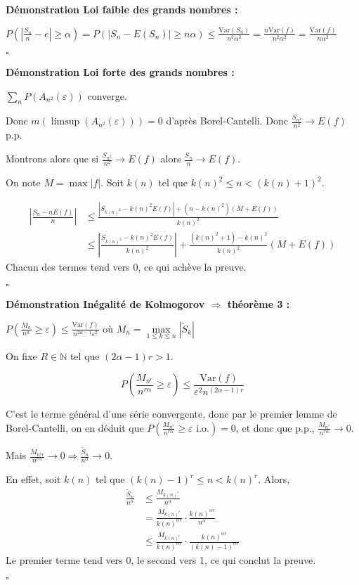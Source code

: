 \documentclass[10pt,a4paper,notitlepage ]{report}
\newcommand{\N}{\mathbb N}
\newcommand{\1}{\mathds 1}
\newcommand{\eps}{\varepsilon}
\newcommand{\var}{\mathrm{Var}}
\newcounter{th}
\newenvironment{demo}[1][]{

	\textbf{Démonstration #1 :}
}{\begin{flushright}
	$\square$
\end{flushright}
}
\begin{document}
\begin{demo}[Loi faible des grands nombres]
	
	$P(\left|\frac {S_n} n - e \right| \ge \alpha) = P(|S_n - E(S_n)| \ge n\alpha) \le \frac{\var(S_n)}{n^2\alpha^2} = \frac{n \var(f)}{n^2\alpha^2} = \frac{\var(f)}{n\alpha^2}$
\end{demo}

\begin{demo}[Loi forte des grands nombres]
	$\sum_n P(A_{n^2}(\eps))$ converge.
	
	Donc $m(\limsup(A_{n^2}(\eps)))= 0$ d'après Borel-Cantelli. Donc $\frac {S_{n^2}} {n^2} \rightarrow E(f)$ p.p.
	
	Montrons alors que si $\frac {S_{n^2}} {n^2} \rightarrow E(f)$ alors $\frac {S_n} n \rightarrow E(f)$.
	
	On note $M = \max |f|$. Soit $k(n)$ tel que $k(n)^2 \le n < (k(n) + 1)^2$.
	
	\begin{align*}
		\left| \frac{S_n - nE(f)} n \right| &\le \frac{|S_{k(n)^2} - k(n)^2E(f)| + (n-k(n)^2)(M+E(f))}{k(n)^2} \\
		&\le \left| \frac {S_{k(n)^2} - k(n)^2E(f)}{k(n)^2} \right| + \frac{(k(n)^2 +1) - k(n)^2}{k(n)^2} (M + E(f))
	\end{align*}
	Chacun des termes tend vers $0$, ce qui achève la preuve.
\end{demo}

\begin{demo}[Inégalité de Kolmogorov $\Rightarrow$ théorème 3]
	
	$P(\frac{M_n}{n^\alpha} \ge \eps) \le \frac{\var(f)}{n^{2\alpha -1}\eps^2}$ où $M_n = \underset{1\le k \le n}\max |\tilde S_k|$
	
	On fixe $R\in\N$ tel que $(2\alpha -1)r > 1$.
	
	\[P(\frac{M_{n^r}}{n^{r\alpha}} \ge \eps) \le \frac{\var(f)}{\eps^2 n^{(2\alpha - 1)r}}\]
	
	C'est le terme général d'une série convergente, donc par le premier lemme de Borel-Cantelli, on en déduit que $P(\frac{M_{n^r}}{n^{r\alpha}} \ge \eps \text{ i.o.}) = 0$, et donc que p.p., $\frac{M_{n^r}}{n^{r\alpha}} \rightarrow 0$.
	
	Mais $\frac{M_{n^rr}}{n^{r\alpha}} \rightarrow 0 \Rightarrow \frac{\tilde S_n}{n^\alpha} \rightarrow 0$.
	
	En effet, soit $k(n)$ tel que $(k(n) -1)^r \le n < k(n)^r$. Alors,
	\begin{align*}
		\frac{\tilde S_n}{n^\alpha} &\le \frac{M_{k(n)^r}}{n^\alpha} \\
		& = \frac{M_{k(n)^r}}{k(n)^{\alpha r}} \cdot \frac{k(n)^{\alpha r}}{n^\alpha} \\
		&\le \frac{M_{k(n)^r}}{k(n)^{\alpha r}} \cdot \frac{k(n)^{\alpha r}}{(k(n) -1)^{\alpha r}}
	\end{align*}
	Le premier terme tend vers 0, le second vers 1, ce qui conclut la preuve.
\end{demo}
\end{document}
